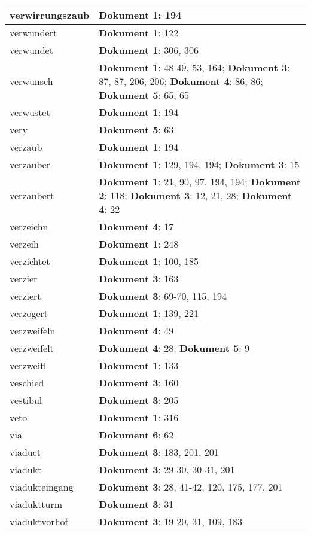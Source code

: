 \documentclass[a5paper]{article}
\begin{document}
\begin{longtable}[l]{|l|p{3in}|}
\hline
verwirrungszaub & \textbf{Dokument 1}: 194 \\
\hline
verwundert & \textbf{Dokument 1}: 122 \\
\hline
verwundet & \textbf{Dokument 1}: 306, 306 \\
\hline
verwunsch & \textbf{Dokument 1}: 48-49, 53, 164; \textbf{Dokument 3}: 87, 87, 206, 206; \textbf{Dokument 4}: 86, 86; \textbf{Dokument 5}: 65, 65 \\
\hline
verwustet & \textbf{Dokument 1}: 194 \\
\hline
very & \textbf{Dokument 5}: 63 \\
\hline
verzaub & \textbf{Dokument 1}: 194 \\
\hline
verzauber & \textbf{Dokument 1}: 129, 194, 194; \textbf{Dokument 3}: 15 \\
\hline
verzaubert & \textbf{Dokument 1}: 21, 90, 97, 194, 194; \textbf{Dokument 2}: 118; \textbf{Dokument 3}: 12, 21, 28; \textbf{Dokument 4}: 22 \\
\hline
verzeichn & \textbf{Dokument 4}: 17 \\
\hline
verzeih & \textbf{Dokument 1}: 248 \\
\hline
verzichtet & \textbf{Dokument 1}: 100, 185 \\
\hline
verzier & \textbf{Dokument 3}: 163 \\
\hline
verziert & \textbf{Dokument 3}: 69-70, 115, 194 \\
\hline
verzogert & \textbf{Dokument 1}: 139, 221 \\
\hline
verzweifeln & \textbf{Dokument 4}: 49 \\
\hline
verzweifelt & \textbf{Dokument 4}: 28; \textbf{Dokument 5}: 9 \\
\hline
verzweifl & \textbf{Dokument 1}: 133 \\
\hline
veschied & \textbf{Dokument 3}: 160 \\
\hline
vestibul & \textbf{Dokument 3}: 205 \\
\hline
veto & \textbf{Dokument 1}: 316 \\
\hline
via & \textbf{Dokument 6}: 62 \\
\hline
viaduct & \textbf{Dokument 3}: 183, 201, 201 \\
\hline
viadukt & \textbf{Dokument 3}: 29-30, 30-31, 201 \\
\hline
viadukteingang & \textbf{Dokument 3}: 28, 41-42, 120, 175, 177, 201 \\
\hline
viaduktturm & \textbf{Dokument 3}: 31 \\
\hline
viaduktvorhof & \textbf{Dokument 3}: 19-20, 31, 109, 183 \\

\end{longtable}
\end{document}
